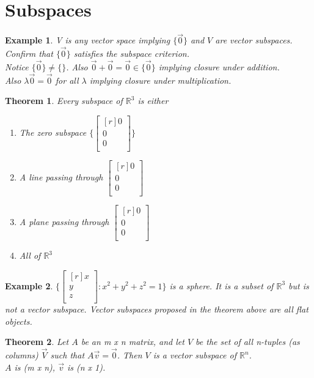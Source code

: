 \documentclass{report}
\newtheorem*{ex}{Example}
\newtheorem*{thrm}{Theorem}
\begin{document}
\section{Subspaces}
\begin{ex} V is any vector space implying $\{\vec{0}\}$ and $V$ are vector subspaces.\\
Confirm that $\{\vec{0}\}$ satisfies the subspace criterion.\\
Notice $\{\vec{0}\} \neq \{\}$. Also $\vec{0} + \vec{0} = \vec{0}\in \{\vec{0}\}$ implying closure under addition.\\
Also $\lambda\vec{0} = \vec{0}$ for all $\lambda$ implying closure under multiplication.
\end{ex}
\begin{thrm}
Every subspace of $\mathbb{R}^3$ is either
	\begin{enumerate}
	\item [0-D] The zero subspace $\{\begin{bmatrix}[r] 0\\ 0\\ 0\\ \end{bmatrix} \}$
	\item [1-D] A line passing through $\begin{bmatrix}[r] 0\\ 0\\ 0\\ \end{bmatrix}$
	\item [2-D] A plane passing through $\begin{bmatrix}[r] 0\\ 0\\ 0\\ \end{bmatrix}$
	\item [3-D] All of $\mathbb{R}^3$
	\end{enumerate}
\end{thrm}
\begin{ex}
$\{\begin{bmatrix}[r] x\\ y\\ z\\ \end{bmatrix} : x^2+y^2+z^2=1 \}$ is a sphere. It is a subset of $\mathbb{R}^3$ but is not a vector subspace. Vector subspaces proposed in the theorem above are all flat objects.
\end{ex}
\begin{thrm}
Let $A$ be an m x n matrix, and let $V$ be the set of all n-tuples (as columns) $\vec{V}$ such that $A\vec{v} = \vec{0}$. Then $V$ is a vector subspace of $\mathbb{R}^n$.\\
$A$ is (m x n), $\vec{v}$ is (n x 1).
\end{thrm}
\end{document}
